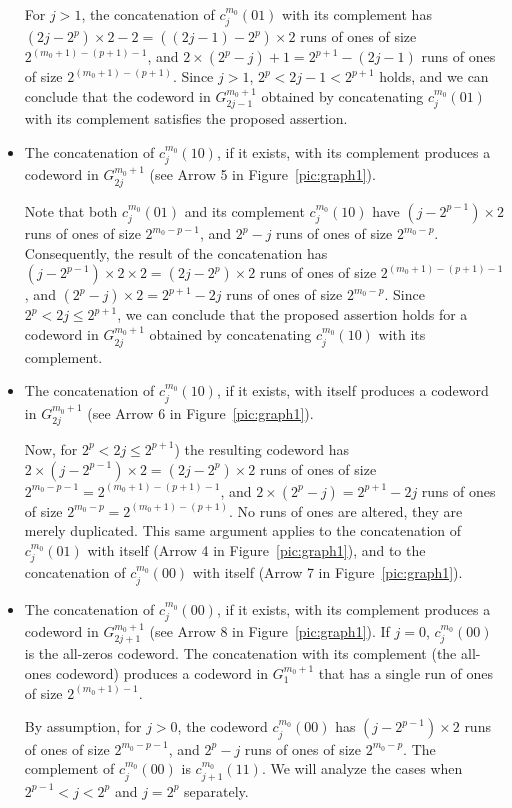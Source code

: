 \begin{itemize}
For $j>1$, the concatenation of $c_j^{m_0}(01)$ with its
complement has $(2j-2^{p})\times 2-2=((2j-1)-2^{p})\times 2$ runs
of ones of size $2^{(m_0+1)-(p+1)-1}$, and
$2\times(2^p-j)+1=2^{p+1}-(2j-1)$ runs of ones of size
$2^{(m_0+1)-(p+1)}$. Since $j>1$, $2^p < 2j-1 < 2^{p+1}$ holds,
and we can conclude that the codeword in $G_{2j-1}^{m_0+1}$
obtained by concatenating $c_j^{m_0}(01)$ with its complement
satisfies the proposed assertion.

\item The concatenation of $c_j^{m_0}(10)$, if it exists, with its
complement produces a codeword in $G_{2j}^{m_0+1}$ (see Arrow 5 in
Figure~\ref{pic:graph1}).

Note that both $c_j^{m_0}(01)$ and its complement $c_j^{m_0}(10)$
have $(j-2^{p-1})\times 2$ runs of ones of size $2^{m_0-p-1}$, and
$2^p-j$ runs of ones of size $2^{m_0-p}$. Consequently, the result
of the concatenation has $(j-2^{p-1})\times 2\times
2=(2j-2^p)\times 2$ runs of ones of size $2^{(m_0+1)-(p+1)-1}$,
and $(2^p-j)\times 2=2^{p+1}-2j$ runs of ones of size $2^{m_0-p}$.
Since $2^p < 2j \leq 2^{p+1}$, we can conclude that the proposed
assertion holds for a codeword in $G_{2j}^{m_0+1}$ obtained by
concatenating $c_j^{m_0}(10)$ with its complement.

\item The concatenation of $c_j^{m_0}(10)$, if it exists, with
itself produces a codeword in $G_{2j}^{m_0+1}$ (see Arrow 6 in
Figure~\ref{pic:graph1}).

Now, for $2^{p}< 2j \leq 2^{p+1}$) the resulting codeword has
$2\times (j-2^{p-1})\times 2=(2j-2^{p})\times 2$ runs of ones of
size $2^{m_0-p-1}=2^{(m_0+1)-(p+1)-1}$, and
$2\times(2^p-j)=2^{p+1}-2j$ runs of ones of size
$2^{m_0-p}=2^{(m_0+1)-(p+1)}$. No runs of ones are altered, they
are merely duplicated. This same argument applies to the
concatenation of $c_j^{m_0}(01)$ with itself  (Arrow 4 in
Figure~\ref{pic:graph1}), and to the concatenation of
$c_j^{m_0}(00)$ with itself (Arrow 7 in Figure~\ref{pic:graph1}).

\item The concatenation of $c_j^{m_0}(00)$, if it exists, with its
complement produces a codeword in $G_{2j+1}^{m_0+1}$ (see Arrow 8
in Figure~\ref{pic:graph1}). If $j=0$, $c_j^{m_0}(00)$ is the
all-zeros codeword. The concatenation with its complement (the
all-ones codeword) produces a codeword in $G_{1}^{m_0+1}$ that has
a single run of ones of size $2^{(m_0+1)-1}$.

By assumption, for $j>0$, the codeword $c_j^{m_0}(00)$ has
$(j-2^{p-1})\times 2$ runs of ones of size $2^{m_0-p-1}$, and
$2^{p}-j$ runs of ones of size $2^{m_0-p}$. The complement of
$c_j^{m_0}(00)$ is $c_{j+1}^{m_0}(11)$. We will analyze the cases
when $2^{p-1} < j < 2^{p}$ and $j=2^{p}$ separately.


\end{itemize}
